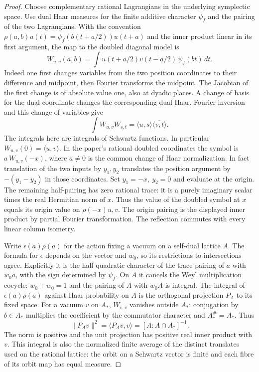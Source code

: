 \begin{proof}
Choose complementary rational Lagrangians in the underlying
symplectic space. Use dual Haar measures for the finite additive
character \(\psi_f\) and the pairing of the two Lagrangians. With
the convention \(\rho(a,b)u(t)=\psi_f(b(t+a/2))u(t+a)\) and the
inner product linear in its first argument, the map to the doubled
diagonal model is
\[
 W_{u,v}(a,b)=\int u(t+a/2)\overline{v(t-a/2)}\,\psi_f(bt)\,dt .
\]
Indeed one first changes variables from the two position coordinates
to their difference and midpoint, then Fourier transforms the
midpoint. The Jacobian of the first change is of absolute value
one, also at dyadic places. A change of basis for the dual
coordinate changes the corresponding dual Haar. Fourier inversion
and this change of variables give
\[
 \int W_{u,v}\overline{W_{s,t}}=
             \langle u,s\rangle\overline{\langle v,t\rangle}.
\]
The integrals here are integrals of Schwartz functions. In
particular \(W_{u,v}(0)=\langle u,v\rangle\).
In the paper's rational doubled coordinates the symbol is
\(a\,W_{u,v}(-x)\), where \(a\ne0\) is the common change of Haar
normalization. In fact translation of the two inputs by
\(y_1,y_2\) translates the position argument by \(-(y_1-y_2)\)
in those coordinates. Set \(y_1=-x,\ y_2=0\) and evaluate at
the origin. The remaining half-pairing has zero rational trace:
it is a purely imaginary scalar times the real Hermitian norm
of \(x\). Thus the value of the doubled symbol at \(x\) equals
its origin value on \(\rho(-x)u,v\). The origin pairing is the
displayed inner product by partial Fourier transformation. The
reflection commutes with every linear column isometry.

Write \(\epsilon(a)\rho(a)\) for the action fixing a vacuum on a
self-dual lattice \(A\). The formula for \(\epsilon\) depends on
the vector and \(w_0\), so its restrictions to intersections
agree. Explicitly it is the half quadratic character of the trace
pairing of \(a\) with \(w_0 a\), with the sign determined by
\(\psi_f\). On \(A\) it cancels the Weyl multiplication cocycle:
\(w_0+\bar w_0=1\) and the pairing of \(A\) with \(w_0A\) is
integral. The integral of \(\epsilon(a)\rho(a)\) against Haar
probability on \(A\) is the orthogonal projection \(P_A\) to its
fixed space. For a vacuum \(v\) on \(A_*\), \(W_{v,v}\) vanishes
outside \(A_*\): conjugation by \(b\in A_*\) multiplies the
coefficient by the commutator character and \(A_*^\#=A_*\).
Thus
\[
 \|P_Av\|^2=\langle P_Av,v\rangle
      =[A:A\cap A_*]^{-1}.
\]
The norm is positive and the unit projection has positive real
inner product with \(v\). This integral is also the normalized
finite average of the distinct translates used on the rational
lattice: the orbit on a Schwartz vector is finite and each fibre
of its orbit map has equal measure.


\end{proof}
